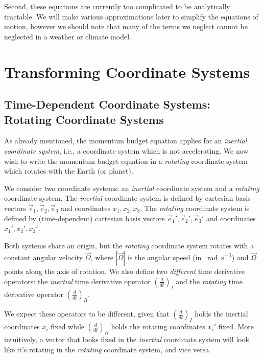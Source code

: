 Second, these equations are currently too complicated to be analytically tractable. We will make various approximations later to simplify the equations of motion, however we should note that many of the terms we neglect cannot be neglected in a weather or climate model.

\section{Transforming Coordinate Systems}\label{s Transforming EoM}

\subsection{Time-Dependent Coordinate Systems: Rotating Coordinate Systems}\label{ss Rotating}

As already mentioned, the momentum budget equation applies for an \textit{inertial coordinate system}, i.e., a coordinate system which is not accelerating. We now wish to write the momentum budget equation in a \textit{rotating} coordinate system which rotates with the Earth (or planet).

We consider two coordinate systems: an \textit{inertial} coordinate system and a \textit{rotating} coordinate system. The \textit{inertial} coordinate system is defined by cartesian basis vectors \(\vec{e}_1, \vec{e}_2, \vec{e}_3\) and coordinates \(x_1,x_2,x_3\). The \textit{rotating} coordinate system is defined by (time-dependent) cartesian basis vectors \(\vec{e}_1', \vec{e}_2', \vec{e}_3'\) and coordinates \(x_1',x_2',x_3'\). 

Both systems share an origin, but the \textit{rotating} coordinate system rotates with a constant angular velocity \(\vec{\Omega}\), where \(|\vec{\Omega}|\) is the angular speed (in \qty{}{\radian\per\second}) and \(\vec{\Omega}\) points along the axis of rotation. We also define two \textit{different} time derivative operators: the \textit{inertial} time derivative operator \(\left(\frac{d}{d t}\right)_{I}\) and the \textit{rotating} time derivative operator \(\left(\frac{d}{d t}\right)_{R}\).

We expect these operators to be different, given that \(\left(\frac{d}{d t}\right)_{I}\) holds the inertial coordinates \(x_i\) fixed while \(\left(\frac{d}{d t}\right)_{R}\) holds the rotating coordinates \(x_i'\) fixed. More intuitively, a vector that looks fixed in the \textit{inertial} coordinate system will look like it's rotating in the \textit{rotating} coordinate system, and vice versa.

